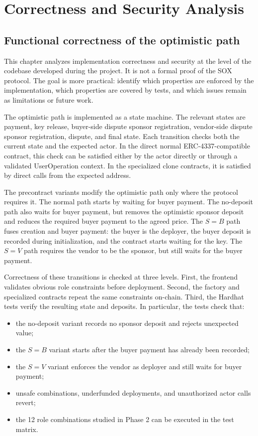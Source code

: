 \chapter{Correctness and Security Analysis}
\label{chap:correctness-security}

\section{Functional correctness of the optimistic path}

This chapter analyzes implementation correctness and security at the level of the codebase
developed during the project. It is not a formal proof of the SOX protocol. The goal is more
practical: identify which properties are enforced by the implementation, which properties
are covered by tests, and which issues remain as limitations or future work.

The optimistic path is implemented as a state machine. The relevant states are payment,
key release, buyer-side dispute sponsor registration, vendor-side dispute sponsor
registration, dispute, and final state. Each transition checks both the current state and the
expected actor. In the direct normal ERC-4337-compatible contract, this check can be
satisfied either by the actor directly or through a validated UserOperation context. In the
specialized clone contracts, it is satisfied by direct calls from the expected address.

The precontract variants modify the optimistic path only where the protocol requires it.
The normal path starts by waiting for buyer payment. The no-deposit path also waits for
buyer payment, but removes the optimistic sponsor deposit and reduces the required buyer
payment to the agreed price. The \(S=B\) path fuses creation and buyer payment: the buyer is
the deployer, the buyer deposit is recorded during initialization, and the contract starts
waiting for the key. The \(S=V\) path requires the vendor to be the sponsor, but still waits
for the buyer payment.

Correctness of these transitions is checked at three levels. First, the frontend validates
obvious role constraints before deployment. Second, the factory and specialized contracts
repeat the same constraints on-chain. Third, the Hardhat tests verify the resulting state
and deposits. In particular, the tests check that:

\begin{itemize}
  \item the no-deposit variant records no sponsor deposit and rejects unexpected value;
  \item the \(S=B\) variant starts after the buyer payment has already been recorded;
  \item the \(S=V\) variant enforces the vendor as deployer and still waits for buyer
  payment;
  \item unsafe combinations, underfunded deployments, and unauthorized actor calls revert;
  \item the 12 role combinations studied in Phase 2 can be executed in the test matrix.
\end{itemize}

